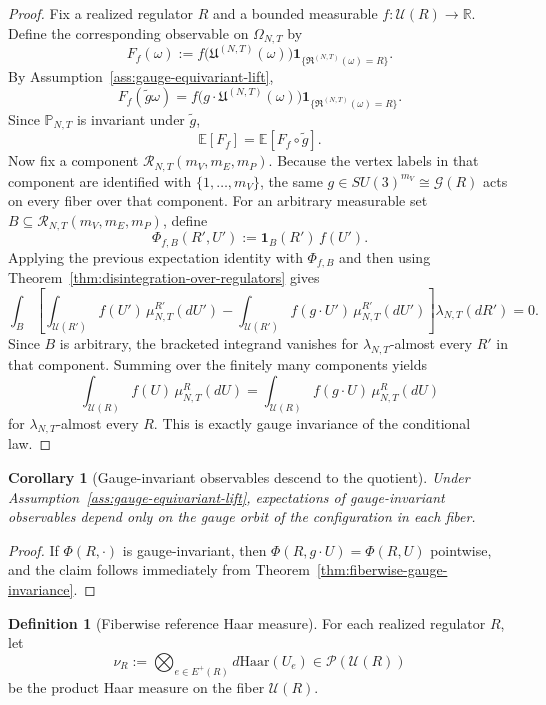 \documentclass[11pt]{article}
\newtheorem{corollary}[theorem]{Corollary}
\theoremstyle{definition}
\newtheorem{definition}[theorem]{Definition}
\theoremstyle{remark}
\newcommand{\R}{\mathbb R}
\newcommand{\E}{\mathbb E}
\begin{document}
\begin{proof}
Fix a realized regulator \(R\) and a bounded measurable
\(f:\mathscr U(R)\to\R\). Define the corresponding observable on
\(\Omega_{N,T}\) by
\[
F_f(\omega):=
f\bigl(\mathfrak U^{(N,T)}(\omega)\bigr)\mathbf 1_{\{\mathfrak R^{(N,T)}(\omega)=R\}}.
\]
By Assumption~\ref{ass:gauge-equivariant-lift},
\[
F_f(\widetilde g\omega)
=
f\bigl(g\cdot \mathfrak U^{(N,T)}(\omega)\bigr)
\mathbf 1_{\{\mathfrak R^{(N,T)}(\omega)=R\}}.
\]
Since \(\mathbb P_{N,T}\) is invariant under \(\widetilde g\),
\[
\E[F_f]=\E[F_f\circ \widetilde g].
\]
Now fix a component \(\mathscr R_{N,T}(m_V,m_E,m_P)\). Because the vertex labels
in that component are identified with \(\{1,\dots,m_V\}\), the same
\(g\in SU(3)^{m_V}\cong\mathcal G(R)\) acts on every fiber over that component.
For an arbitrary measurable set \(B\subseteq\mathscr R_{N,T}(m_V,m_E,m_P)\),
define
\[
\Phi_{f,B}(R',U')
:=
\mathbf 1_B(R')\,f(U').
\]
Applying the previous expectation identity with \(\Phi_{f,B}\) and then using
Theorem~\ref{thm:disintegration-over-regulators} gives
\[
\int_B
\left[
\int_{\mathscr U(R')} f(U')\,\mu_{N,T}^{R'}(dU')
-
\int_{\mathscr U(R')} f(g\cdot U')\,\mu_{N,T}^{R'}(dU')
\right]
\lambda_{N,T}(dR')
=0.
\]
Since \(B\) is arbitrary, the bracketed integrand vanishes for
\(\lambda_{N,T}\)-almost every \(R'\) in that component. Summing over the
finitely many components yields
\[
\int_{\mathscr U(R)}f(U)\,\mu_{N,T}^R(dU)
=
\int_{\mathscr U(R)}f(g\cdot U)\,\mu_{N,T}^R(dU)
\]
for \(\lambda_{N,T}\)-almost every \(R\). This is exactly gauge invariance of
the conditional law.
\end{proof}

\begin{corollary}[Gauge-invariant observables descend to the quotient]
\label{cor:gauge-invariant-observables-descend}
Under Assumption~\ref{ass:gauge-equivariant-lift}, expectations of
gauge-invariant observables depend only on the gauge orbit of the configuration
in each fiber.
\end{corollary}

\begin{proof}
If \(\Phi(R,\cdot)\) is gauge-invariant, then
\(\Phi(R,g\cdot U)=\Phi(R,U)\) pointwise, and the claim follows immediately
from Theorem~\ref{thm:fiberwise-gauge-invariance}.
\end{proof}

\begin{definition}[Fiberwise reference Haar measure]
\label{def:fiberwise-reference-haar}
For each realized regulator \(R\), let
\[
\nu_R:=\bigotimes_{e\in E^+(R)} d\mathrm{Haar}(U_e)\in\mathcal P(\mathscr U(R))
\]
be the product Haar measure on the fiber \(\mathscr U(R)\).
\end{definition}
\end{document}
